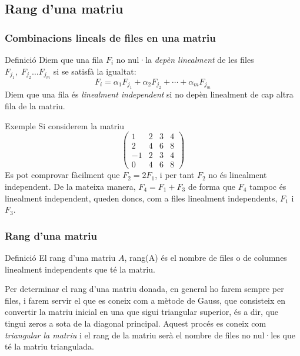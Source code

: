 \documentclass{beamer}
\begin{document}
\subsection{Rang d'una matriu}
\begin{frame}\frametitle{Combinacions lineals de files en una matriu}
\begin{block}{Definició}
Diem que una fila $F_{i}$ no nul·la \emph{depèn linealment} de les files $F_{j_{1}},\; F_{j_{2}}\ldots F_{j_{m}}$ si se satisfà la igualtat:
$$F_{i}=\alpha_{1}F_{j_{1}}+\alpha_{2}F_{j_{2}}+\cdots +\alpha_{m}F_{j_{m}}$$
Diem que una fila és \emph{linealment independent} si no depèn linealment de cap altra fila de la matriu.
\end{block}
\end{frame}

\begin{frame}
\begin{exampleblock}{Exemple}
Si considerem la matriu $$\left(\begin{array}{cccc}
1 & 2 & 3 & 4\\
2 & 4 & 6 & 8\\
-1 & 2 & 3 & 4\\
0 & 4 & 6 & 8\end{array}\right)$$ Es pot comprovar fàcilment que $F_{2}= 2F_{1}$, i per tant $F_{2}$ no és linealment independent. De la mateixa manera, $F_{4}= F_{1}+F_{3}$ de forma que $F_{4}$ tampoc és linealment independent, queden doncs, com a files linealment independents, $F_{1}$ i $F_{3}$.

\end{exampleblock}
\end{frame}

\begin{frame}\frametitle{Rang d'una matriu}
\begin{block}{Definició}
El rang d'una matriu $A$, rang(A) és el nombre de files o de columnes linealment independents que té la matriu.
\end{block}
Per determinar el rang d'una matriu donada, en general ho farem sempre per files, i farem servir el que es coneix com a mètode de Gauss, que consisteix en convertir la matriu inicial en una que sigui triangular superior, és a dir, que tingui zeros a sota de la diagonal principal. Aquest procés es coneix com \emph{triangular la matriu} i el rang de la matriu serà el nombre de files no nul·les que té la matriu triangulada.
\end{frame}
\end{document}
